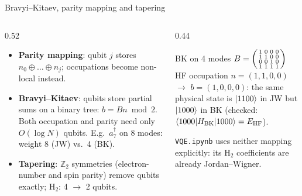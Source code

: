 \documentclass[aspectratio=169,11pt]{beamer}
\newcommand{\key}[1]{{\color{qdark}\textbf{#1}}}
\begin{document}
\begin{frame}{Bravyi--Kitaev, parity mapping and tapering}
  \begin{columns}[T]
    \begin{column}{0.52\textwidth}
      \begin{itemize}
        \item \key{Parity mapping}: qubit $j$ stores $n_0 \oplus \dots \oplus n_j$; occupations become non-local instead.
        \item \key{Bravyi--Kitaev}: qubits store partial sums on a binary tree: $b = Bn \bmod 2$. Both occupation and parity
          need only $O(\log N)$ qubits. E.g.\ $a_7^\dagger$ on 8 modes: weight 8 (JW) vs.\ 4 (BK).
        \item \key{Tapering}: $\mathbb Z_2$ symmetries (electron-number and spin parity) remove qubits exactly; H$_2$: 4 $\to$ 2 qubits.
      \end{itemize}
    \end{column}
    \begin{column}{0.44\textwidth}
      \begin{exampleblock}{BK on 4 modes}
        $B = \begin{psmallmatrix}1&0&0&0\\1&1&0&0\\0&0&1&0\\1&1&1&1\end{psmallmatrix}$\\[1mm]
        HF occupation $n = (1,1,0,0)$ $\to$ $b = (1, 0, 0, 0)$: the same physical state is $\ket{1100}$ in JW but $\ket{1000}$ in BK
        (checked: $\braket{1000|H_{\mathrm{BK}}|1000} = E_{\mathrm{HF}}$).
      \end{exampleblock}
      \small \texttt{VQE.ipynb} uses neither mapping explicitly: its H$_2$ coefficients are already Jordan--Wigner.
    \end{column}
  \end{columns}
\end{frame}
\end{document}
